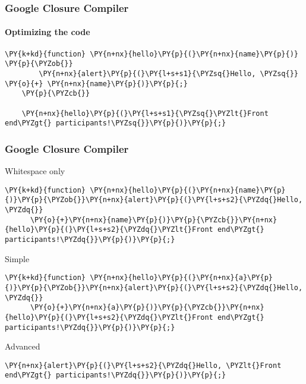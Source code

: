 \begin{frame}[fragile]
  \frametitle{Google Closure Compiler}
  \framesubtitle{Optimizing the code}

  \begin{Verbatim}[commandchars=\\\{\}]
    \PY{k+kd}{function} \PY{n+nx}{hello}\PY{p}{(}\PY{n+nx}{name}\PY{p}{)} \PY{p}{\PYZob{}}
        \PY{n+nx}{alert}\PY{p}{(}\PY{l+s+s1}{\PYZsq{}Hello, \PYZsq{}} \PY{o}{+} \PY{n+nx}{name}\PY{p}{)}\PY{p}{;}
    \PY{p}{\PYZcb{}}

    \PY{n+nx}{hello}\PY{p}{(}\PY{l+s+s1}{\PYZsq{}\PYZlt{}Front end\PYZgt{} participants!\PYZsq{}}\PY{p}{)}\PY{p}{;}
  \end{Verbatim}
\end{frame}


\begin{frame}[fragile]
  \frametitle{Google Closure Compiler}

  \begin{block}{Whitespace only}
    \begin{Verbatim}[commandchars=\\\{\}]
      \PY{k+kd}{function} \PY{n+nx}{hello}\PY{p}{(}\PY{n+nx}{name}\PY{p}{)}\PY{p}{\PYZob{}}\PY{n+nx}{alert}\PY{p}{(}\PY{l+s+s2}{\PYZdq{}Hello, \PYZdq{}}
      \PY{o}{+}\PY{n+nx}{name}\PY{p}{)}\PY{p}{\PYZcb{}}\PY{n+nx}{hello}\PY{p}{(}\PY{l+s+s2}{\PYZdq{}\PYZlt{}Front end\PYZgt{} participants!\PYZdq{}}\PY{p}{)}\PY{p}{;}
    \end{Verbatim}
  \end{block}

  \pause

  \begin{block}{Simple}
    \begin{Verbatim}[commandchars=\\\{\}]
      \PY{k+kd}{function} \PY{n+nx}{hello}\PY{p}{(}\PY{n+nx}{a}\PY{p}{)}\PY{p}{\PYZob{}}\PY{n+nx}{alert}\PY{p}{(}\PY{l+s+s2}{\PYZdq{}Hello, \PYZdq{}}
      \PY{o}{+}\PY{n+nx}{a}\PY{p}{)}\PY{p}{\PYZcb{}}\PY{n+nx}{hello}\PY{p}{(}\PY{l+s+s2}{\PYZdq{}\PYZlt{}Front end\PYZgt{} participants!\PYZdq{}}\PY{p}{)}\PY{p}{;}
    \end{Verbatim}
  \end{block}

  \pause

  \begin{block}{Advanced}
    \begin{Verbatim}[commandchars=\\\{\}]
      \PY{n+nx}{alert}\PY{p}{(}\PY{l+s+s2}{\PYZdq{}Hello, \PYZlt{}Front end\PYZgt{} participants!\PYZdq{}}\PY{p}{)}\PY{p}{;}
    \end{Verbatim}

  \end{block}
\end{frame}



